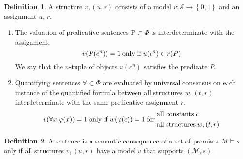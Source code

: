 \documentclass{amsbook}
\newcommand{\setsm}[1]{\left\{#1\right\}}
\newcommand{\univ}[1]{\mathord\forall#1\;}
\newcommand{\valids}{\mathrel\vDash}
\theoremstyle{definition}
\newtheorem{dfn}{Definition}[section]
\begin{document}
\begin{dfn}
    A structure $v, (u, r)$ consists of a model $v: \mathcal S \longrightarrow \setsm{0,1}$ and an assignment $u$, $r$.
    \begin{enumerate}
        \item
              The valuation of predicative sentences $\mathrm P \subset \Phi$ is interdeterminate with the assignment.
              $$v(P(c^n)) = 1 \text{\;only if\;} u(c^n) \in r(P)$$
              We say that the $n$-tuple of objects $u(c^n)$ satisfies the predicate $P$.
        \item
              Quantifying sentences $\mathord\forall \subset \Phi$ are evaluated by universal consensus on each instance of the quantified formula between all structures $w, (t, r)$ interdeterminate with the same predicative assignment $r$.
              $$v(\univ x \varphi(x)) = 1 \text{\;only if\;} w(\varphi(c)) = 1 \text{\;for\;} \begin{aligned}
                       & \text{all constants\;} c \\
                       &
                      \text{all structures\;}
                      w, (t, r)
                  \end{aligned}$$
    \end{enumerate}
\end{dfn}

\begin{dfn}
    A sentence is a semantic consequence of a set of premises $\mathcal M \valids s$ only if all structures $v, (u, r)$ have a model $v$ that supports $(\mathcal M, s)$.
\end{dfn}
\end{document}
